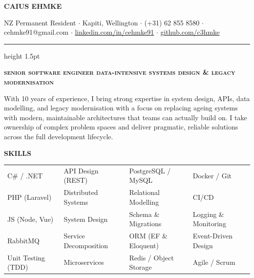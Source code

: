 \documentclass[10pt, a4paper]{article}
\newcommand{\cvsection}[1]{%
  \vspace{4pt}
  \begin{tcolorbox}[
    colback=sectionblue!15,
    colframe=sectionblue!15,
    sharp corners,
    boxrule=0pt,
    left=0pt, right=0pt,
    top=2pt, bottom=2pt
  ]
  \centering\small\headingfont\bfseries\scshape\color{sectionblue}\MakeUppercase{#1}
  \end{tcolorbox}
  \vspace{4pt}
}
\begin{document}
\begin{center}
  {\Huge\headingfont\bfseries\color{sectionblue}CAIUS EHMKE}\\[4pt]
  
  \vspace{8pt}
  
  \fontsize{7.75pt}{9.25pt}
  \selectfont NZ Permanent Resident
  \enspace $\cdot$ \enspace Kapiti, Wellington
  \enspace $\cdot$ \enspace (+31) 62 855 8580
  \enspace $\cdot$ \enspace cehmke91@gmail.com
  \enspace $\cdot$ \enspace \href{https://linkedin.com/in/cehmke91}{linkedin.com/in/cehmke91}
  \enspace $\cdot$ \enspace \href{https://github.com/c3hmke}{github.com/c3hmke} 
\end{center}

\vspace{2pt}
{\color{ruleblue}\hrule height 1.5pt}
\vspace{2pt}

\begin{center}
  \headingfont\bfseries\scshape senior software engineer \quad\textbar\quad data-intensive systems design \& legacy modernisation
\end{center}
\vspace{2pt}

\color[gray]{0.3} %

With 10 years of experience, I bring strong expertise in system design, APIs, data modelling, and legacy modernisation 
with a focus on replacing ageing systems with modern, maintainable architectures that teams can actually build on. 
I take ownership of complex problem spaces and deliver pragmatic, reliable solutions across the full development lifecycle.
\vspace{4pt}

\cvsection{Skills}
\begin{tabular}{@{} p{} p{} p{} p{} @{}}
  C\# / .NET          & API Design (REST)     & PostgreSQL / MySQL           & Docker / Git\\
  PHP (Laravel)       & Distributed Systems   & Relational Modelling         & CI/CD \\
  JS (Node, Vue)      & System Design         & Schema \& Migrations         & Logging \& Monitoring \\
  RabbitMQ            & Service Decomposition & ORM (EF \& Eloquent)         & Event-Driven Design \\
  Unit Testing (TDD)  & Microservices         & Redis / Object Storage       & Agile / Scrum
\end{tabular}
\end{document}
